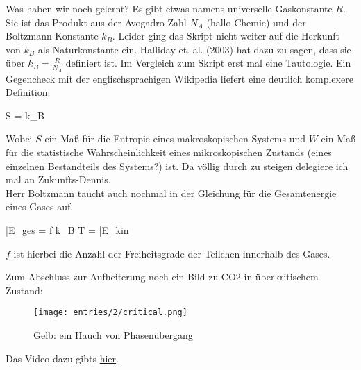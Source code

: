 Was haben wir noch gelernt? Es gibt etwas namens universelle Gaskonstante \(R\). Sie ist das Produkt aus der Avogadro-Zahl \(N_A\) (hallo Chemie) und der Boltzmann-Konstante \(k_B\). Leider
ging das Skript nicht weiter auf die Herkunft von \(k_B\) als Naturkonstante ein. Halliday et. al. (2003) hat dazu zu sagen, dass sie über \(k_B = \frac{R}{N_A}\) definiert ist. 
Im Vergleich zum Skript erst mal eine Tautologie. Ein Gegencheck mit der englischsprachigen Wikipedia liefert eine deutlich komplexere Definition:

\be
    S = k_B 
\ee

Wobei \(S\) ein Maß für die Entropie eines makroskopischen Systems und \(W\) ein Maß für die statistische Wahrscheinlichkeit eines mikroskopischen Zustands (eines einzelnen Bestandteils des Systems?) ist.
Da völlig durch zu steigen delegiere ich mal an Zukunfts-Dennis.\\
Herr Boltzmann taucht auch nochmal in der Gleichung für die Gesamtenergie eines Gases auf.

\be
    \bar{E}_{ges} = f k_B T = \bar{E}_{kin}
\ee

\(f\) ist hierbei die Anzahl der Freiheitsgrade der Teilchen innerhalb des Gases.

Zum Abschluss zur Aufheiterung noch ein Bild zu CO2 in überkritischem Zustand:

\begin{figure}[h]
    \centering
    \texttt{[image: entries/2/critical.png]}
    \caption{Gelb: ein Hauch von Phasenübergang}
\end{figure}
Das Video dazu gibts \textcolor{blue}{\hyperlink{https://www.youtube.com/watch?v=RmaJVxafesU}{hier}}.